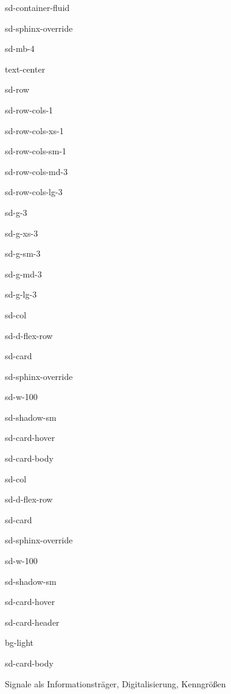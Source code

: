 \documentclass[letterpaper,10pt,english]{jupyterBook}
\let\sphinxpxdimen\pdfpxdimen\else\newdimen\sphinxpxdimen
\begin{document}
\begin{sphinxuseclass}{sd-container-fluid}
\begin{sphinxuseclass}{sd-sphinx-override}
\begin{sphinxuseclass}{sd-mb-4}
\begin{sphinxuseclass}{text-center}
\begin{sphinxuseclass}{sd-row}
\begin{sphinxuseclass}{sd-row-cols-1}
\begin{sphinxuseclass}{sd-row-cols-xs-1}
\begin{sphinxuseclass}{sd-row-cols-sm-1}
\begin{sphinxuseclass}{sd-row-cols-md-3}
\begin{sphinxuseclass}{sd-row-cols-lg-3}
\begin{sphinxuseclass}{sd-g-3}
\begin{sphinxuseclass}{sd-g-xs-3}
\begin{sphinxuseclass}{sd-g-sm-3}
\begin{sphinxuseclass}{sd-g-md-3}
\begin{sphinxuseclass}{sd-g-lg-3}
\begin{sphinxuseclass}{sd-col}
\begin{sphinxuseclass}{sd-d-flex-row}
\begin{sphinxuseclass}{sd-card}
\begin{sphinxuseclass}{sd-sphinx-override}
\begin{sphinxuseclass}{sd-w-100}
\begin{sphinxuseclass}{sd-shadow-sm}
\begin{sphinxuseclass}{sd-card-hover}
\begin{sphinxuseclass}{sd-card-body}
\end{sphinxuseclass}{\hyperref[\detokenize{content/2_Stationaer::doc}]{}}
\end{sphinxuseclass}
\end{sphinxuseclass}
\end{sphinxuseclass}
\end{sphinxuseclass}
\end{sphinxuseclass}
\end{sphinxuseclass}
\end{sphinxuseclass}
\begin{sphinxuseclass}{sd-col}
\begin{sphinxuseclass}{sd-d-flex-row}
\begin{sphinxuseclass}{sd-card}
\begin{sphinxuseclass}{sd-sphinx-override}
\begin{sphinxuseclass}{sd-w-100}
\begin{sphinxuseclass}{sd-shadow-sm}
\begin{sphinxuseclass}{sd-card-hover}
\begin{sphinxuseclass}{sd-card-header}
\begin{sphinxuseclass}{bg-light}
\sphinxAtStartPar
{}

\end{sphinxuseclass}
\end{sphinxuseclass}
\begin{sphinxuseclass}{sd-card-body}
\noindent\sphinxincludegraphics[height=120\sphinxpxdimen]{{messsignal_analog_diskret}.png}

\sphinxAtStartPar
Signale als Informationsträger, Digitalisierung, Kenngrößen


\end{sphinxuseclass}
\end{sphinxuseclass}
\end{sphinxuseclass}
\end{sphinxuseclass}
\end{sphinxuseclass}
\end{sphinxuseclass}
\end{sphinxuseclass}
\end{sphinxuseclass}
\end{sphinxuseclass}
\end{sphinxuseclass}
\end{sphinxuseclass}
\end{sphinxuseclass}
\end{sphinxuseclass}
\end{sphinxuseclass}
\end{sphinxuseclass}
\end{sphinxuseclass}
\end{sphinxuseclass}
\end{sphinxuseclass}
\end{sphinxuseclass}
\end{sphinxuseclass}
\end{sphinxuseclass}
\end{sphinxuseclass}
\end{sphinxuseclass}
\end{document}
